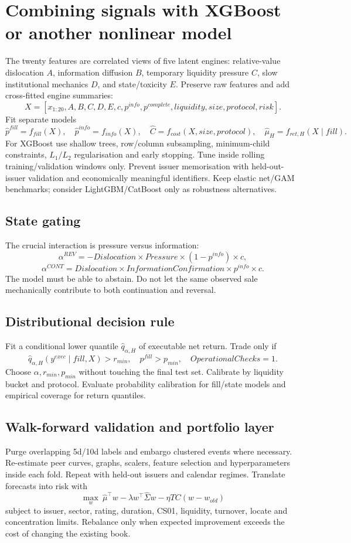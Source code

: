 \documentclass[10pt]{article}
\begin{document}
\section{Combining signals with XGBoost or another nonlinear model}
The twenty features are correlated views of five latent engines: relative-value dislocation $A$, information diffusion $B$, temporary liquidity pressure $C$, slow institutional mechanics $D$, and state/toxicity $E$. Preserve raw features and add cross-fitted engine summaries:
\[X=[x_{1:20},A,B,C,D,E,c,p^{info},p^{complete},liquidity,size,protocol,risk].\]
Fit separate models
\[\widehat p^{fill}=f_{fill}(X),\quad \widehat p^{info}=f_{info}(X),\quad \widehat C=f_{cost}(X,size,protocol),\quad \widehat\mu_H=f_{ret,H}(X\mid fill).\]
For XGBoost use shallow trees, row/column subsampling, minimum-child constraints, $L_1/L_2$ regularisation and early stopping. Tune inside rolling training/validation windows only. Prevent issuer memorisation with held-out-issuer validation and economically meaningful identifiers. Keep elastic net/GAM benchmarks; consider LightGBM/CatBoost only as robustness alternatives.

\subsection{State gating}
The crucial interaction is pressure versus information:
\[\alpha^{REV}=-Dislocation\times Pressure\times(1-p^{info})\times c,\]
\[\alpha^{CONT}=Dislocation\times InformationConfirmation\times p^{info}\times c.\]
The model must be able to abstain. Do not let the same observed sale mechanically contribute to both continuation and reversal.

\subsection{Distributional decision rule}
Fit a conditional lower quantile $\widehat q_{\alpha,H}$ of executable net return. Trade only if
\[\widehat q_{\alpha,H}(y^{exec}\mid fill,X)>r_{min},\quad p^{fill}>p_{min},\quad OperationalChecks=1.\]
Choose $\alpha,r_{min},p_{min}$ without touching the final test set. Calibrate by liquidity bucket and protocol. Evaluate probability calibration for fill/state models and empirical coverage for return quantiles.

\subsection{Walk-forward validation and portfolio layer}
Purge overlapping 5d/10d labels and embargo clustered events where necessary. Re-estimate peer curves, graphs, scalers, feature selection and hyperparameters inside each fold. Repeat with held-out issuers and calendar regimes. Translate forecasts into risk with
\[\max_w\ \widehat\mu^\top w-\lambda w^\top\widehat\Sigma w-\eta TC(w-w_{old})\]
subject to issuer, sector, rating, duration, CS01, liquidity, turnover, locate and concentration limits. Rebalance only when expected improvement exceeds the cost of changing the existing book.
\newpage
\end{document}
